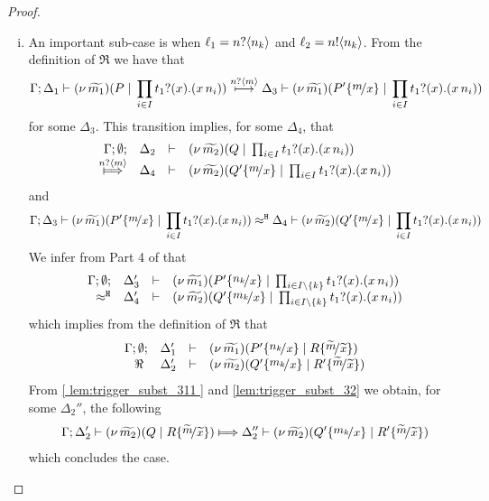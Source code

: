 \begin{proof}
\begin{enumerate}
\begin{enumerate}[i.]
					\item	An important sub-case is when
							$\ell_1 = n ? \langle n_k \rangle$ and $\ell_2 = n ! \langle n_k \rangle$.
							From the definition of $\Re$ we have that
							\[
								\horel{\Gamma}{\Delta_1}{ \newsp{\widetilde{m_1}}{P \Par \prod_{i \in I} \binp{t_1}{x} (\appl{x}{n_i})}}
								{ \hby{ \bactinp{n}{m} } }
								{\Delta_3}{  \newsp{\widetilde{m_1}}{P' \subst{m}{x} \Par \prod_{i \in I} \binp{t_1}{x} (\appl{x}{n_i})}   }
							\]
						for some $\Delta_3$. This transition
							implies, for some $\Delta_4$, that 
							\begin{eqnarray}
								\mhorel{\Gamma}{\Delta_2}{ \newsp{\widetilde{m_2}}{Q \Par \prod_{i \in I} \binp{t_1}{x} (\appl{x}{n_i})}}
								{ \Hby{ \bactinp{n}{m} } }
								{\Delta_4}{}{  \newsp{\widetilde{m_2}}{Q' \subst{m}{x} \Par \prod_{i \in I} \binp{t_1}{x} (\appl{x}{n_i})}   }
								\label{ lem:trigger_subst_311 }
							\end{eqnarray}
							and
							\[
								\horel{\Gamma}{\Delta_3}{  \newsp{\widetilde{m_1}}{P' \subst{m}{x} \Par \prod_{i \in I} \binp{t_1}{x} (\appl{x}{n_i})}   }
								{\hwb}
								{\Delta_4}{  \newsp{\widetilde{m_2}}{Q' \subst{m}{x} \Par \prod_{i \in I} \binp{t_1}{x} (\appl{x}{n_i})}   }
							\]
							We infer from Part 4 of  that
							\[
								\mhorel{\Gamma}{\Delta_3'}{  \newsp{\widetilde{m_1}}{P' \subst{n_k}{x} \Par \prod_{i \in I\backslash\set{k}} \binp{t_1}{x}(\appl{x}{n_i})}   }
								{\hwb}
								{\Delta_4'}{}{  \newsp{\widetilde{m_2}}{Q' \subst{m_k}{x} \Par \prod_{i \in I\backslash\set{k}} \binp{t_1}{x}(\appl{x}{n_i})}   }
							\]
							which implies from the definition of $\Re$ that
							\[
								\mhorel{\Gamma}{\Delta_1'}{\newsp{\widetilde{m_1}}{P' \subst{n_k}{x} \Par R \subst{\widetilde{m}}{\widetilde{x}}}}
								{\ \Re\ }
								{\Delta_2'}{}{  \newsp{\widetilde{m_2}}{Q' \subst{m_k}{x} \Par R' \subst{\widetilde{m}}{\widetilde{x}} } }
							\]
							From \eqref{ lem:trigger_subst_311 } and \eqref{lem:trigger_subst_32} we obtain, for some $\Delta_2''$, the following
							\begin{eqnarray*}
								\horel{\Gamma}{\Delta_2'}{ \newsp{\widetilde{m_2}}{Q \Par R \subst{\widetilde{m}}{\widetilde{x}} }}
								{ \Hby{  } }
								{\Delta_2''}{  \newsp{\widetilde{m_2}}{Q' \subst{m_k}{x} \Par R' \subst{\widetilde{m}}{\widetilde{x}} }   }
							\end{eqnarray*}
							which concludes the case.


\end{enumerate}
\end{enumerate}
\end{proof}

